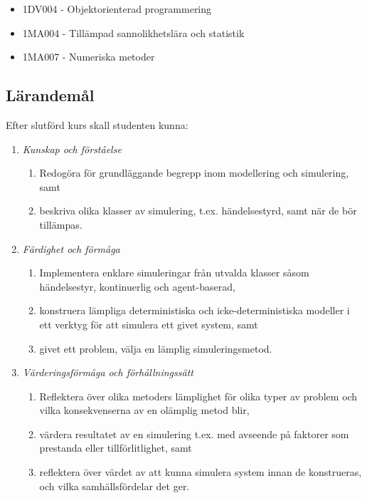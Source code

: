 \begin{itemize}
\tightlist
\item
  1DV004 - Objektorienterad programmering
\item
  1MA004 - Tillämpad sannolikhetslära och statistik
\item
  1MA007 - Numeriska metoder
\end{itemize}

\subsection*{Lärandemål}

Efter slutförd kurs skall studenten kunna:

\begin{enumerate}
\def\labelenumi{\Alph{enumi}.}
\tightlist
\item
  \emph{Kunskap och förståelse}

  \begin{enumerate}
  \def\labelenumii{\Alph{enumi}.\arabic{enumii}.}
  \tightlist
  \item
    Redogöra för grundläggande begrepp inom modellering och simulering,
    samt
  \item
    beskriva olika klasser av simulering, t.ex. händelsestyrd, samt när
    de bör tillämpas.
  \end{enumerate}
\item
  \emph{Färdighet och förmåga}

  \begin{enumerate}
  \def\labelenumii{\Alph{enumi}.\arabic{enumii}.}
  \tightlist
  \item
    Implementera enklare simuleringar från utvalda klasser såsom
    händelsestyr, kontinuerlig och agent-baserad,
  \item
    konstruera lämpliga deterministiska och icke-deterministiska
    modeller i ett verktyg för att simulera ett givet system, samt
  \item
    givet ett problem, välja en lämplig simuleringsmetod.
  \end{enumerate}
\item
  \emph{Värderingsförmåga och förhållningssätt}

  \begin{enumerate}
  \def\labelenumii{\Alph{enumi}.\arabic{enumii}.}
  \tightlist
  \item
    Reflektera över olika metoders lämplighet för olika typer av problem
    och vilka konsekvenserna av en olämplig metod blir,
  \item
    värdera resultatet av en simulering t.ex. med avseende på faktorer
    som prestanda eller tillförlitlighet, samt
  \item
    reflektera över värdet av att kunna simulera system innan de
    konstrueras, och vilka samhällsfördelar det ger.
  \end{enumerate}
\end{enumerate}

